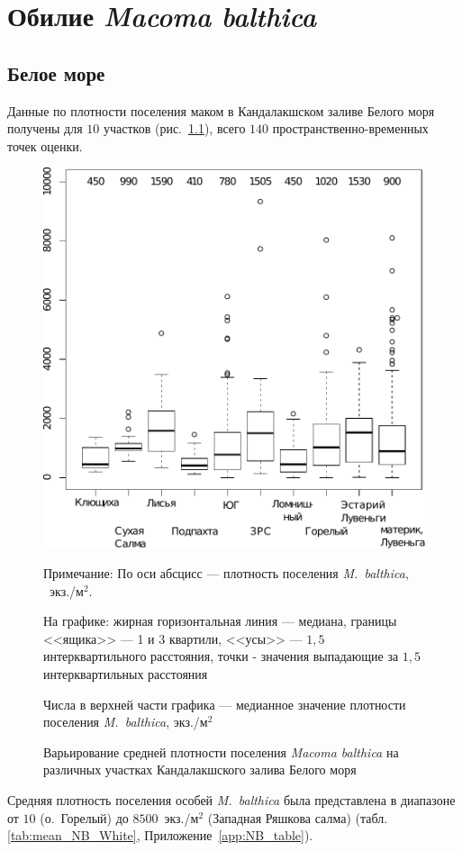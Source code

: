 	\chapter{Обилие {\it Macoma balthica}}
	\section{Белое море}
Данные по плотности поселения маком в Кандалакшском заливе Белого моря получены для $10$ участков (рис.~\ref{ris:N_area_White}), всего $140$ пространственно-временных точек оценки.
	\begin{figure}[p]
	\begin{center}
		\includegraphics[height=0.5\textheight]{../All_N/N2_area_White1.pdf}
	\end{center}
	\caption{Варьирование средней плотности поселения {\it Macoma balthica} на различных участках Кандалакшского залива Белого моря}
	{\footnotesize Примечание: По оси абсцисс --- плотность поселения {\it M.~balthica}, ~экз./м$^2$.

	На графике: жирная горизонтальная линия --- медиана, границы <<ящика>> --- 1 и 3 квартили, <<усы>> --- $1,5$ интерквартильного расстояния, точки - значения выпадающие за $1,5$ интерквартильных расстояния

Числа в верхней части графика --- медианное значение плотности поселения {\it M.~balthica}, экз./м$^2$}
	\label{ris:N_area_White}
	\end{figure}
Средняя плотность поселения особей {\it M.~balthica} была представлена в диапазоне от $10$ (о.~Горелый) до $8500$~экз./м$^2$ (Западная Ряшкова салма) (табл. \ref{tab:mean_NB_White}, Приложение~\ref{app:NB_table}).

